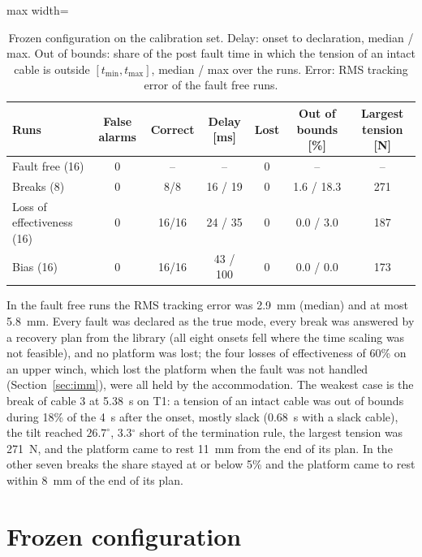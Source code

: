 \documentclass[10pt]{article}
\begin{document}
\begin{table}[h]
\centering\small
\caption{Frozen configuration on the calibration set. Delay: onset to declaration, median / max. Out of bounds: share of the post fault time in which the tension of an intact cable is outside $[t_{\min},t_{\max}]$, median / max over the runs. Error: RMS tracking error of the fault free runs.}\label{tab:check}
\begin{adjustbox}{max width=\linewidth}\begin{tabular}{@{}lcccccc@{}}
\toprule
Runs & False alarms & Correct & Delay [ms] & Lost & Out of bounds [\%] & Largest tension [N] \\
\midrule
Fault free (16) & 0 & -- & -- & 0 & -- & -- \\
Breaks (8) & 0 & 8/8 & 16 / 19 & 0 & 1.6 / 18.3 & 271 \\
Loss of effectiveness (16) & 0 & 16/16 & 24 / 35 & 0 & 0.0 / 3.0 & 187 \\
Bias (16) & 0 & 16/16 & 43 / 100 & 0 & 0.0 / 0.0 & 173 \\
\bottomrule
\end{tabular}\end{adjustbox}
\end{table}

In the fault free runs the RMS tracking error was 2.9~mm (median) and at most 5.8~mm. Every fault was declared as the true mode, every break was answered by a recovery plan from the library (all eight onsets fell where the time scaling was not feasible), and no platform was lost; the four losses of effectiveness of 60\% on an upper winch, which lost the platform when the fault was not handled (Section~\ref{sec:imm}), were all held by the accommodation. The weakest case is the break of cable 3 at 5.38~s on T1: a tension of an intact cable was out of bounds during 18\% of the 4~s after the onset, mostly slack (0.68~s with a slack cable), the tilt reached $26.7^\circ$, 3.3$^\circ$ short of the termination rule, the largest tension was 271~N, and the platform came to rest 11~mm from the end of its plan. In the other seven breaks the share stayed at or below 5\% and the platform came to rest within 8~mm of the end of its plan.

\section{Frozen configuration}\label{sec:freeze}
\end{document}

